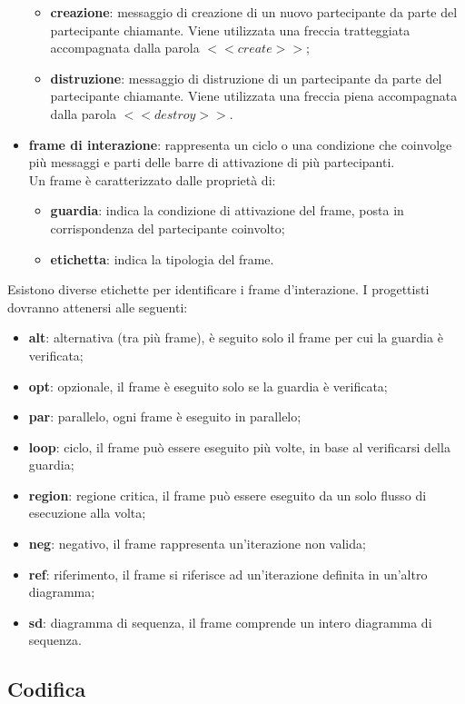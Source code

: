 \begin{itemize}
\begin{itemize}
	\item \textbf{creazione}: messaggio di creazione di un nuovo partecipante da parte del partecipante chiamante. Viene utilizzata una freccia tratteggiata accompagnata dalla parola $<<create>>$;
	\item \textbf{distruzione}: messaggio di distruzione di un partecipante da parte del partecipante chiamante. Viene utilizzata una freccia piena accompagnata dalla parola $<<destroy>>$.
\end{itemize}
	\item \textbf{frame di interazione}: rappresenta un ciclo o una condizione che coinvolge più messaggi e parti delle barre di attivazione di più partecipanti. \\
	Un frame è caratterizzato dalle proprietà di:
\begin{itemize}
	\item \textbf{guardia}: indica la condizione di attivazione del frame, posta in corrispondenza del partecipante coinvolto;
	\item \textbf{etichetta}: indica la tipologia del frame.
\end{itemize}
\end{itemize}
Esistono diverse etichette per identificare i frame d'interazione. I progettisti dovranno attenersi alle seguenti:
\begin{itemize}
	\item \textbf{alt}: alternativa (tra più frame), è seguito solo il frame per cui la guardia è verificata;
	\item \textbf{opt}: opzionale, il frame è eseguito solo se la guardia è verificata;
	\item \textbf{par}: parallelo, ogni frame è eseguito in parallelo;
	\item \textbf{loop}: ciclo, il frame può essere eseguito più volte, in base al verificarsi della guardia;
	\item \textbf{region}: regione critica, il frame può essere eseguito da un solo flusso di esecuzione alla volta;
	\item \textbf{neg}: negativo, il frame rappresenta un'iterazione non valida;
	\item \textbf{ref}: riferimento, il frame si riferisce ad un'iterazione definita in un'altro diagramma;
	\item \textbf{sd}: diagramma di sequenza, il frame comprende un intero diagramma di sequenza.
\end{itemize}
\subsection{Codifica}\label{ProcessiPrimariCodifica}

